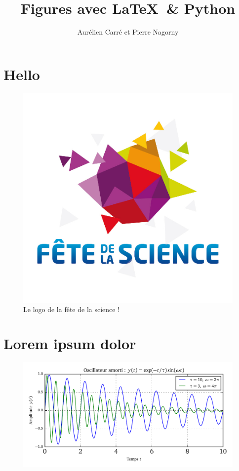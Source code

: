 \documentclass[10pt,a4paper]{article}
\title{Figures avec \LaTeX \ \& Python}
\author{Aurélien Carré et Pierre Nagorny}
\begin{document}
\maketitle

\section{Hello}

\begin{figure}[h]
\begin{center}
\includegraphics[width = .5\textwidth]{fete-science.jpg}
\caption{Le logo de la fête de la science !}
\end{center}
\end{figure}

\section{Lorem ipsum dolor}

\lipsum[1-13]

\begin{figure}[h]
\begin{center}
\includegraphics{Oscillateur}
\end{center}
\end{figure}

\lipsum[1-13]
\end{document}
